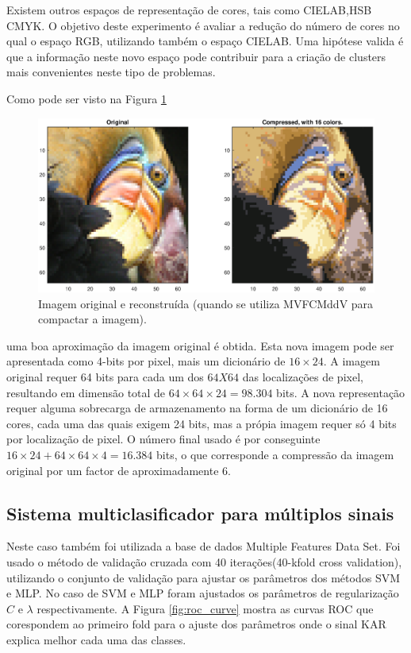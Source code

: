 \documentclass[12pt]{article}
\begin{document}
Existem outros espaços de representação de cores, tais como CIELAB,HSB CMYK. O objetivo deste experimento é avaliar a redução do número de cores no qual o espaço RGB, utilizando também o espaço CIELAB. Uma hipótese valida é que a informação neste novo espaço pode contribuir para a criação de clusters mais convenientes neste tipo de problemas.

Como pode ser visto na Figura \ref{fig:image_compress} 
\begin{figure}[h]
\centering
\includegraphics[width=5.5in]{../out/image-compress-16.eps}
\caption{Imagem original e reconstruída (quando se utiliza MVFCMddV para compactar a imagem).}
\label{fig:image_compress}
\end{figure}  
uma boa aproximação da imagem original é obtida. Esta nova imagem pode ser apresentada como 4-bits por pixel, mais um dicionário de $16\times24$. A imagem original requer 64 bits para cada um dos $64X64$ das localizações de pixel, resultando em dimensão total de $64\times64\times24 = 98.304$ bits. A nova representação requer alguma sobrecarga de armazenamento na forma de um dicionário de 16 cores, cada uma das quais exigem 24 bits, mas a própia imagem requer só 4 bits por localização de pixel. O número final usado é por conseguinte $16\times24 + 64\times64\times4 = 16.384$ bits, o que corresponde a compressão da imagem original por um factor de aproximadamente 6.



\subsection{Sistema multiclasificador para múltiplos sinais}

Neste caso também  foi utilizada a base de dados Multiple Features Data Set. Foi usado o método de validação cruzada com 40 iterações(40-kfold cross validation),  utilizando o conjunto de validação para ajustar os parâmetros dos métodos SVM e MLP. No caso de SVM e MLP  foram ajustados os parâmetros de regularização $C$ e $\lambda$ respectivamente. A Figura \ref{fig:roc_curve} mostra as curvas ROC  que corespondem ao primeiro fold para o ajuste dos parâmetros onde o sinal KAR explica melhor cada uma das classes.
\end{document}
